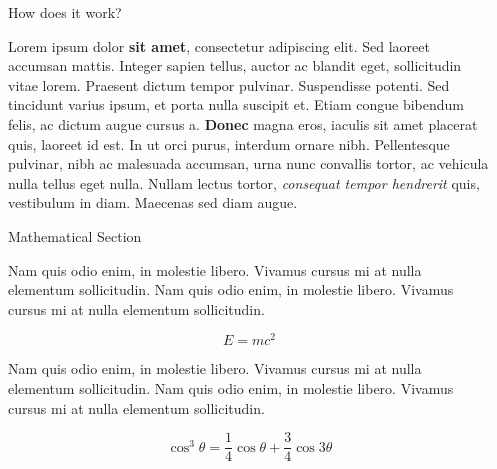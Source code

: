 \documentclass[final]{beamer}
\newlength{\sepwid}
\newlength{\onecolwid}
\begin{document}
\begin{frame}[t]
\begin{columns}[t]
\begin{column}{\sepwid}
\end{column} %


\begin{column}{\onecolwid} %


\begin{block}{How does it work?}

Lorem ipsum dolor \textbf{sit amet}, consectetur adipiscing elit. Sed laoreet accumsan mattis. Integer sapien tellus, auctor ac blandit eget, sollicitudin vitae lorem. Praesent dictum tempor pulvinar. Suspendisse potenti. Sed tincidunt varius ipsum, et porta nulla suscipit et. Etiam congue bibendum felis, ac dictum augue cursus a. \textbf{Donec} magna eros, iaculis sit amet placerat quis, laoreet id est. In ut orci purus, interdum ornare nibh. Pellentesque pulvinar, nibh ac malesuada accumsan, urna nunc convallis tortor, ac vehicula nulla tellus eget nulla. Nullam lectus tortor, \textit{consequat tempor hendrerit} quis, vestibulum in diam. Maecenas sed diam augue.

\end{block}

\begin{block}{Mathematical Section}

Nam quis odio enim, in molestie libero. Vivamus cursus mi at nulla elementum sollicitudin. Nam quis odio enim, in molestie libero. Vivamus cursus mi at nulla elementum sollicitudin.
  
\begin{equation}
E = mc^{2}
\label{eqn:Einstein}
\end{equation}

Nam quis odio enim, in molestie libero. Vivamus cursus mi at nulla elementum sollicitudin. Nam quis odio enim, in molestie libero. Vivamus cursus mi at nulla elementum sollicitudin.

\begin{equation}
\cos^3 \theta =\frac{1}{4}\cos\theta+\frac{3}{4}\cos 3\theta
\label{eq:refname}
\end{equation}


\end{block}
\end{column}
\end{columns}
\end{frame}
\end{document}
